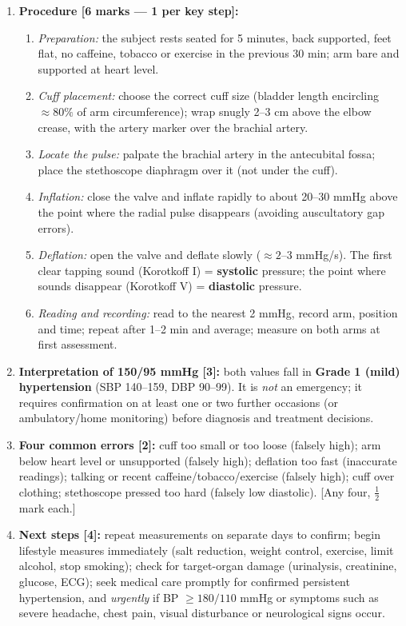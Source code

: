 \documentclass[11pt]{article}
\begin{document}
\begin{corrige}
\begin{enumerate}
\item \textbf{Procedure [6 marks — 1 per key step]:}
\begin{enumerate}
\item \emph{Preparation:} the subject rests seated for 5 minutes, back supported, feet flat, no caffeine, tobacco or exercise in the previous 30 min; arm bare and supported at heart level.
\item \emph{Cuff placement:} choose the correct cuff size (bladder length encircling $\approx 80\%$ of arm circumference); wrap snugly 2--3 cm above the elbow crease, with the artery marker over the brachial artery.
\item \emph{Locate the pulse:} palpate the brachial artery in the antecubital fossa; place the stethoscope diaphragm over it (not under the cuff).
\item \emph{Inflation:} close the valve and inflate rapidly to about 20--30 mmHg above the point where the radial pulse disappears (avoiding auscultatory gap errors).
\item \emph{Deflation:} open the valve and deflate slowly ($\approx 2$--3 mmHg/s). The first clear tapping sound (Korotkoff I) = \textbf{systolic} pressure; the point where sounds disappear (Korotkoff V) = \textbf{diastolic} pressure.
\item \emph{Reading and recording:} read to the nearest 2 mmHg, record arm, position and time; repeat after 1--2 min and average; measure on both arms at first assessment.
\end{enumerate}
\item \textbf{Interpretation of 150/95 mmHg [3]:} both values fall in \textbf{Grade 1 (mild) hypertension} (SBP 140--159, DBP 90--99). It is \emph{not} an emergency; it requires confirmation on at least one or two further occasions (or ambulatory/home monitoring) before diagnosis and treatment decisions.
\item \textbf{Four common errors [2]:} cuff too small or too loose (falsely high); arm below heart level or unsupported (falsely high); deflation too fast (inaccurate readings); talking or recent caffeine/tobacco/exercise (falsely high); cuff over clothing; stethoscope pressed too hard (falsely low diastolic). [Any four, $\frac{1}{2}$ mark each.]
\item \textbf{Next steps [4]:} repeat measurements on separate days to confirm; begin lifestyle measures immediately (salt reduction, weight control, exercise, limit alcohol, stop smoking); check for target-organ damage (urinalysis, creatinine, glucose, ECG); seek medical care promptly for confirmed persistent hypertension, and \emph{urgently} if BP $\ge 180/110$ mmHg or symptoms such as severe headache, chest pain, visual disturbance or neurological signs occur.
\end{enumerate}
\end{corrige}
\end{document}
